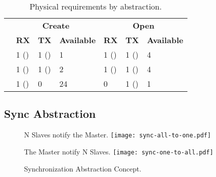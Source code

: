 			\begin{table}[!tb]
				\centering%
				\caption{Physical requirements by abstraction.}%
				\label{tab.abstractions-amount}%

				\begin{tabular}{l|l|l|l|l|l|l|}
					\cline{2-7}
															& \multicolumn{3}{c|}{\textbf{Create}}  & \multicolumn{3}{c|}{\textbf{Open}}                              \\ \cline{2-7}
															& \multicolumn{1}{|c|}{\textbf{RX}}
															            & \multicolumn{1}{|c|}{\textbf{TX}}
																		            & \multicolumn{1}{|c|}{\textbf{Available}}
																					                & \multicolumn{1}{|c|}{\textbf{RX}}
																							                    & \multicolumn{1}{|c|}{\textbf{TX}}
																							        			            & \multicolumn{1}{|c|}{\textbf{Available}} \\ \hline
					\multicolumn{1}{|l|}{\textbf{\mailbox}} & 1 (\dnoc) & 1 (\cnoc) & 1             & 1 (\cnoc) & 1 (\dnoc) & 4                                        \\ \hline
					\multicolumn{1}{|l|}{\textbf{\portal}}  & 1 (\dnoc) & 1 (\cnoc) & 2             & 1 (\cnoc) & 1 (\dnoc) & 4                                        \\ \hline
					\multicolumn{1}{|l|}{\textbf{\sync}}    & 1 (\cnoc) & 0         & 24            & 0         & 1 (\cnoc) & 1                                        \\ \hline
				\end{tabular}

			\end{table}

		\subsection{Sync Abstraction}
		\label{sec.sync-abs}

			\begin{figure}[!tb]
				\centering%
				\caption{Synchronization Abstraction Concept.}%
				\label{fig:conpt_sync}%

					{N Slaves notify the Master.}%
					{\texttt{[image: sync-all-to-one.pdf]}}%

				\hfill

					{The Master notify N Slaves.}%
					{\texttt{[image: sync-one-to-all.pdf]}}%

			\end{figure}

